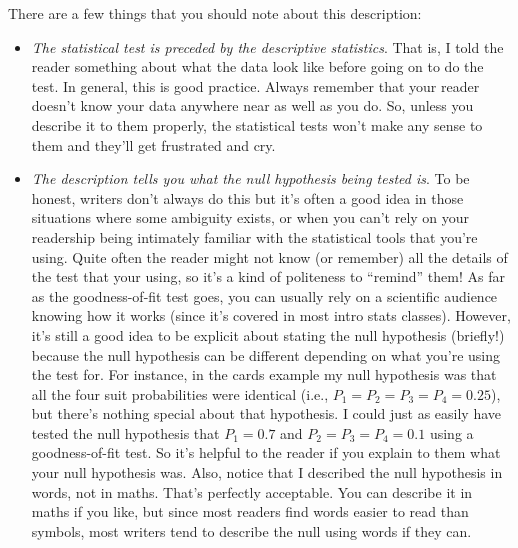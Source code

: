 \noindent
There are a few things that you should note about this description:
\begin{itemize}
\item {\it The statistical test is preceded by the descriptive statistics}. That is, I told the reader something about what the data look like before going on to do the test. In general, this is good practice. Always remember that your reader doesn't know your data anywhere near as well as you do. So, unless you describe it to them properly, the statistical tests won't make any sense to them and they'll get frustrated and cry.
\item {\it The description tells you what the null hypothesis being tested is}. To be honest, writers don't always do this but it's often a good idea in those situations where some ambiguity exists, or when you can't rely on your readership being intimately familiar with the statistical tools that you're using. Quite often the reader might not know (or remember) all the details of the test that your using, so it's a kind of politeness to ``remind'' them! As far as the goodness-of-fit test goes, you can usually rely on a scientific audience knowing how it works (since it's covered in most intro stats classes). However, it's still a good idea to be explicit about stating the null hypothesis (briefly!) because the null hypothesis can be different depending on what you're using the test for. For instance, in the cards example my null hypothesis was that all the four suit probabilities were identical (i.e., $P_1 = P_2 = P_3 = P_4 = 0.25$), but there's nothing special about that hypothesis. I could just as easily have tested the null hypothesis that $P_1 = 0.7$ and $P_2 = P_3 = P_4 = 0.1$ using a goodness-of-fit test. So it's helpful to the reader if you explain to them what your null hypothesis was. Also, notice that I described the null hypothesis in words, not in maths. That's perfectly acceptable. You can describe it in maths if you like, but since most readers find words easier to read than symbols, most writers tend to describe the null using words if they can.

\end{itemize}
